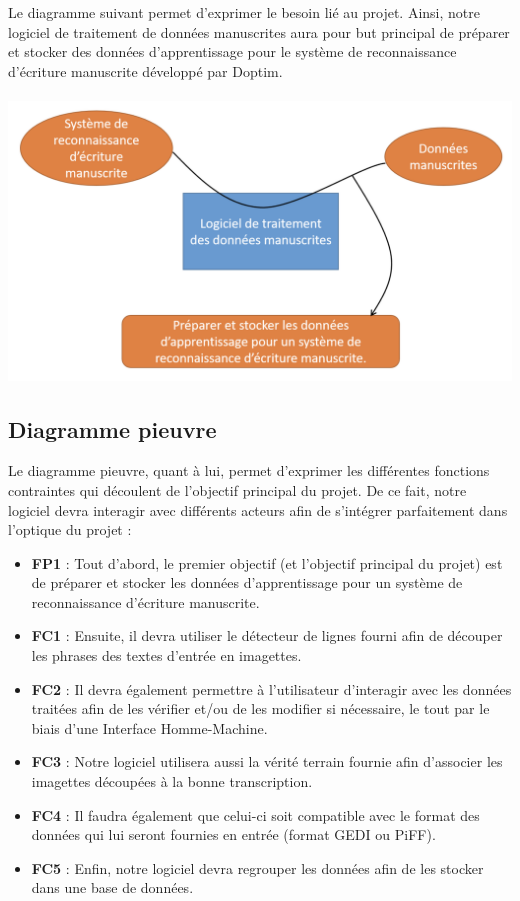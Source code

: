 Le diagramme suivant permet d’exprimer le besoin lié au projet. Ainsi, notre logiciel de
traitement de données manuscrites aura pour but principal de préparer et stocker des données
d’apprentissage pour le système de reconnaissance d’écriture manuscrite développé par Doptim.

\paragraph{}
\begin{mdframed}
\begin{center}
\includegraphics[width=0.7\linewidth]{bete-a-cornes.png}
\end{center}
\end{mdframed}

\newpage
\subsection{Diagramme pieuvre}

Le diagramme pieuvre, quant à lui, permet d’exprimer les différentes fonctions contraintes
qui découlent de l’objectif principal du projet. De ce fait, notre logiciel devra interagir
avec différents acteurs afin de s’intégrer parfaitement dans l’optique du projet :

\begin{itemize}
\item \textbf{FP1} : Tout d’abord, le premier objectif (et l’objectif principal du projet) est
de préparer et stocker les données d’apprentissage pour un système de reconnaissance d’écriture manuscrite.
\item \textbf{FC1} : Ensuite, il devra utiliser le détecteur de lignes fourni afin de découper
les phrases des textes d’entrée en imagettes. 
\item \textbf{FC2} : Il devra également permettre à l’utilisateur d’interagir avec les données
traitées afin de les vérifier et/ou de les modifier si nécessaire, le tout par le biais d’une Interface Homme-Machine. 
\item \textbf{FC3} : Notre logiciel utilisera aussi la vérité terrain fournie afin d’associer
les imagettes découpées à la bonne transcription.
\item \textbf{FC4} : Il faudra également que celui-ci soit compatible avec le format des données
qui lui seront fournies en entrée (format GEDI ou PiFF).
\item \textbf{FC5} : Enfin, notre logiciel devra regrouper les données afin de les stocker dans une base de données.
\end{itemize}

